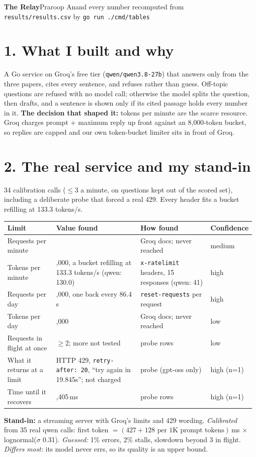 \documentclass[10pt]{extarticle}
\newcommand{\tcap}[1]{\par\vspace{4pt}{\small\bfseries #1}\par\vspace{2pt}}
\newcommand{\code}[1]{\texttt{\small #1}}
\begin{document}
{\large\bfseries The Relay}\hfill{\small Praroop Anand \textperiodcentered{} every number recomputed from \code{results/results.csv} by \code{go run ./cmd/tables}}
\vspace{-2pt}

\section*{1. What I built and why}
A Go service on Groq's free tier (\code{qwen/qwen3.8-27b}) that answers only from the three papers, cites every sentence, and refuses rather than guess. Off-topic questions are refused with no model call; otherwise the model splits the question, then drafts, and a sentence is shown only if its cited passage holds every number in it. \textbf{The decision that shaped it:} tokens per minute are the scarce resource. Groq charges prompt + maximum reply up front against an 8,000-token bucket, so replies are capped and our own token-bucket limiter sits in front of Groq.

\section*{2. The real service and my stand-in}
34 calibration calls ($\le$3 a minute, on questions kept out of the scored set), including a deliberate probe that forced a real 429. Every header fits a bucket refilling at 133.3 tokens/s.
\tcap{Table 1: Limits found in the real service}
{\footnotesize\begin{tabularx}{\linewidth}{@{}l>{\raggedright\arraybackslash}X>{\raggedright\arraybackslash}Xl@{}}\toprule
Limit & Value found & How found & Confidence\\\midrule
Requests per minute & 30 & Groq docs; never reached & medium\\
Tokens per minute & 8,000, a bucket refilling at 133.3 tokens/s (qwen: 130.0) & \code{x-ratelimit} headers, 15 responses (qwen: 41) & high\\
Requests per day & 1,000, one back every 86.4\,s & \code{reset-requests} per request & high\\
Tokens per day & 200,000 & Groq docs; never reached & low\\
Requests in flight at once & $\ge$2; more not tested & probe rows & low\\
What it returns at a limit & HTTP 429, \code{retry-after: 20}, ``try again in 19.845s''; not charged & probe (gpt-oss only) & high (n=1)\\
Time until it recovers & 21,405\,ms & probe rows & high (n=1)\\\bottomrule
\end{tabularx}}\par\vspace{3pt}
\textbf{Stand-in:} a streaming server with Groq's limits and 429 wording. \emph{Calibrated} from 35 real qwen calls: first token $=(427+128\text{ per 1K prompt tokens})$\,ms $\times$ lognormal($\sigma$ 0.31). \emph{Guessed:} 1\% errors, 2\% stalls, slowdown beyond 3 in flight. \emph{Differs most:} its model never errs, so its quality is an upper bound.
\end{document}
